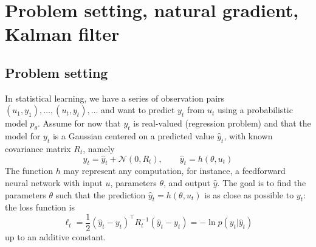 \documentclass[11pt,a4paper]{article}
\newcommand{\1}{\mathbbm{1}}
\theoremstyle{yannthm}
\theoremstyle{yannthm2}
\newcommand{\transp}[1]{#1^{\!\top}\!}
\newcommand{\gaussian}{\mathcal{N}}
\numberwithin{equation}{section}
\begin{document}
\section{Problem setting, natural gradient, Kalman filter}
\label{sec:setting}

\subsection{Problem setting}
In statistical learning,
we have a series of observation pairs
$(u_1,y_1),\ldots,(u_t,y_t),\ldots$ and want to predict $y_t$ from $u_t$
using a probabilistic model $p_\theta$. Assume for now that $y_t$ is
real-valued (regression problem) and that the model for
$y_t$ is a Gaussian centered on a predicted value $\hat y_t$, with known
covariance matrix $R_t$, namely
\begin{equation}
y_t=\hat y_t+\gaussian(0,R_t) ,
\qquad
\hat y_t=h(\theta,u_t)
\end{equation}
The function $h$ may represent any computation, for instance, a feedforward neural network with input $u$, parameters
$\theta$, and output $\hat y$. The goal is to find the parameters $\theta$ such that the prediction
$\hat y_t=h(\theta,u_t)$
is as close as possible to $y_t$: the loss function is
\begin{equation}
\ell_t=\frac12 \transp{(\hat y_t-y_t)}R_t^{-1}(\hat y_t-y_t)=-\ln p(y_t|\hat y_t)
\end{equation}
up to an additive constant.
\end{document}
